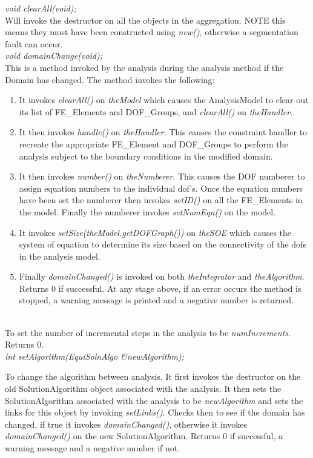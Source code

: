 {\em void clearAll(void);} \\
Will invoke the destructor on all the objects in the aggregation. NOTE
this means they must have been constructed using {\em new()},
otherwise a segmentation fault can occur.\\

{\em void domainChange(void);}\\
This is a method invoked by the analysis during the analysis method if
the Domain has changed. The method invokes the following:
\begin{enumerate} 
\item It invokes {\em clearAll()} on {\em theModel} which causes the
AnalysisModel to clear out its list of FE\_Elements and DOF\_Groups,
and {\em clearAll()} on {\em theHandler}.
\item It then invokes {\em handle()} on {\em theHandler}. This causes
the constraint handler to recreate the appropriate FE\_Element and
DOF\_Groups to perform the analysis subject to the boundary conditions
in the modified domain.
\item It then invokes {\em number()} on {\em theNumberer}. This causes
the DOF numberer to assign equation numbers to the individual
dof's. Once the equation numbers have been set the numberer then
invokes {\em setID()} on all the FE\_Elements in the model. Finally
the numberer invokes {\em setNumEqn()} on the model.
\item It invokes {\em setSize(theModel.getDOFGraph())} on {\em
theSOE} which causes the system of equation to determine its size
based on the connectivity of the dofs in the analysis model. 
\item Finally {\em domainChanged()} is invoked on both {\em theIntegrator} and 
{\em theAlgorithm}. 
Returns $0$ if successful. At any stage above, if an error occurs the
method is stopped, a warning message is printed and a negative number
is returned. \\ 
\end{enumerate}

\\ 
To set the number of incremental steps in the analysis to be {\em
numIncrements}. Returns $0$.\\

{\em int setAlgorithm(EquiSolnAlgo \&newAlgorithm);}

To change the algorithm between analysis. It first invokes the
destructor on the old SolutionAlgorithm object associated with the
analysis. It then sets the SolutionAlgorithm 
associated with the analysis to be {\em newAlgorithm} and sets the
links for this object by invoking {\em setLinks()}. Checks then to
see if the domain has changed, if true it invokes {\em
domainChanged()}, otherwise it invokes {\em domainChanged()} on the
new SolutionAlgorithm. Returns $0$ if successful, a warning message
and a negative number if not.\\

